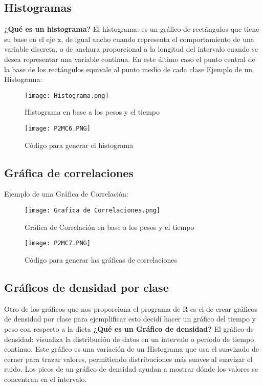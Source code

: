 \documentclass{article}
\begin{document}
\subsection{Histogramas}
\textbf{¿Qué es un histograma?}
\newline
El histograma: es un gráfico de rectángulos que tiene su base en el eje x, de igual ancho cuando representa el comportamiento de una variable discreta, o de anchura proporcional a la longitud del intervalo cuando se desea representar una variable continua. En
este último caso el punto central de la base de los rectángulos equivale al punto medio de cada clase
\newline
Ejemplo de un Histograma:
\begin{figure}[h]
    \centering
    \texttt{[image: Histograma.png]}
    \caption{Histograma en base a los pesos y el tiempo }
    \label{fig:mesh6}
\end{figure}

\newpage
\begin{figure}[h]
    \centering
    \texttt{[image: P2MC6.PNG]}
    \caption{Código para generar el histograma }
    \label{fig:mesh7}
\end{figure}

\subsection{Gráfica de correlaciones}
Ejemplo de una Gráfica de Correlación:
\begin{figure}[h]
    \centering   
    \texttt{[image: Grafica de Correlaciones.png]}
    \caption{Gráfica de Correlación en base a los pesos y el tiempo }
    \label{fig:mesh8}
\end{figure}
\begin{figure}[h]
    \centering
    \texttt{[image: P2MC7.PNG]}
    \caption{Código para generar las gráficas de correlaciones  } 
    \label{fig:mesh9}
\end{figure}

\subsection{Gráficos de densidad por clase}
Otro de los gráficos que nos proporciona el programa de R es el de crear gráficos de densidad por clase para ejemplificar esto decidí hacer un gráfico del tiempo y peso con respecto a la dieta
\newpage
{}
\textbf{¿Qué es un Gráfico de densidad?}
\newline
El gráfico de densidad: visualiza la distribución de datos en un intervalo o período de tiempo continuo. Este gráfico es una variación de un Histograma que usa el suavizado de cerner para trazar valores, permitiendo distribuciones más suaves al suavizar el ruido. Los picos de un gráfico de densidad ayudan a mostrar dónde los valores se concentran en el intervalo.
\end{document}
